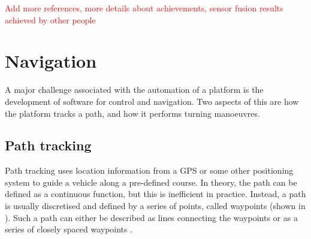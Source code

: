 \documentclass[main.tex]{subfiles}
\begin{document}
\textcolor{red}{Add more references, more details about achievements, sensor fusion results achieved by other people}
\section{Navigation}
A major challenge associated with the automation of a platform is the development of software for control and navigation. Two aspects of this are how the platform tracks a path, and how it performs turning manoeuvres. 

\subsection{Path tracking}
Path tracking uses location information from a GPS or some other positioning system to guide a vehicle along a pre-defined course. In theory, the path can be defined as a continuous function, but this is inefficient in practice. Instead, a path is usually discretised and defined by a series of points, called waypoints (shown in ). Such a path can either be described as lines connecting the waypoints or as a series of closely spaced waypoints \parencite{Giesbrecht2005}.
\end{document}
